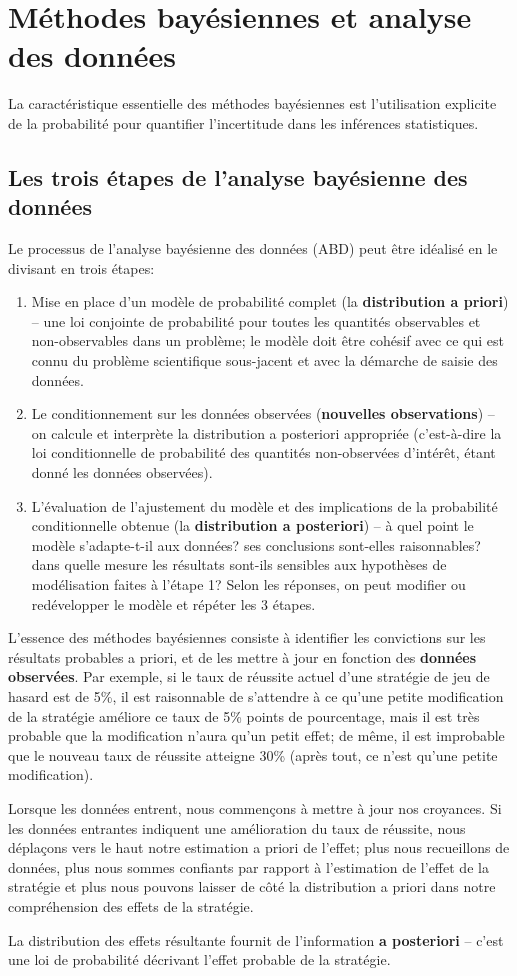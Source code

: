 
\section{Méthodes bayésiennes et analyse des données}
La caractéristique essentielle des méthodes bayésiennes est l'utilisation explicite de la probabilité pour quantifier l'incertitude dans les inférences statistiques.
\subsection{Les trois étapes de l'analyse bayésienne des données} 
 Le processus de l'analyse bayésienne des données  (ABD) peut être idéalisé en le divisant en trois étapes:
\begin{enumerate}[noitemsep]
\item Mise en place d'un modèle de probabilité complet (la \textbf{distribution a priori}) -- une loi conjointe de probabilité pour toutes les quantités observables et non-observables dans un problème; le modèle doit être cohésif avec ce qui est connu du problème scientifique sous-jacent et avec la d\'emarche de saisie des données.
\item Le conditionnement sur les données observées (\textbf{nou\-vel\-les observations}) -- on calcule et interprète la distribution a posteriori appropriée (c'est-à-dire la loi conditionnelle de probabilité des quantités non-observées d'int\'er\^et, étant donné les données observées). 
\item L'évaluation de l'ajustement du modèle et des  implications de la probabilit\'e conditionnelle obtenue (la  \textbf{distribution a posteriori}) -- à quel point le modèle s'adapte-t-il aux données? ses conclusions sont-elles raisonnables? dans quelle mesure les résultats sont-ils sensibles aux hypothèses de modélisation faites à l'étape 1? Selon les réponses, on peut modifier ou redévelopper le modèle et répéter les 3 étapes.
\end{enumerate}
L'essence des méthodes bayésiennes consiste à identifier les convictions sur les résultats probables a priori, et de les mettre à jour en fonction des \textbf{données observ\'ees}.
\newpage\noindent Par exemple, si le taux de réussite actuel d'une stratégie de jeu de hasard est de 5\%, il est raisonnable de s'attendre \`a ce qu'une petite modification de la stratégie améliore ce taux de 5\% points de pourcentage, mais il est très probable que la modification n'aura qu'un petit effet; de m\^eme, il est improbable que le nouveau taux de réussite atteigne 30\% (après tout, ce n'est qu'une petite modification). \par Lorsque les données entrent, nous commençons à mettre à jour nos croyances. Si les données entrantes indiquent une amélioration du taux de réussite, nous dépla\c{c}ons vers le haut notre estimation a priori de l'effet; plus nous recueillons de données, plus nous sommes confiants par rapport \`a l'estimation de l'effet de la strat\'egie et plus nous pouvons laisser de c\^ot\'e la distribution a priori dans notre compr\'ehension des effets de la strat\'egie. \par La distribution des effets r\'esultante fournit de l'information \textbf{a posteriori} -- c'est une loi de probabilité décrivant l'effet probable de la strat\'egie.